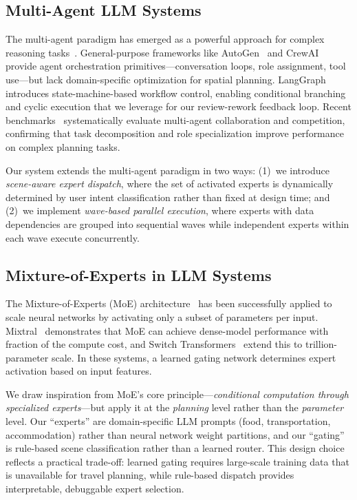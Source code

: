\subsection{Multi-Agent LLM Systems}

The multi-agent paradigm has emerged as a powerful approach for complex reasoning tasks~\cite{tran2025multiagent,xi2023rise}. General-purpose frameworks like AutoGen~\cite{wu2023autogen} and CrewAI~\cite{crewai2024} provide agent orchestration primitives---conversation loops, role assignment, tool use---but lack domain-specific optimization for spatial planning. LangGraph~\cite{langgraph2024} introduces state-machine-based workflow control, enabling conditional branching and cyclic execution that we leverage for our review-rework feedback loop. Recent benchmarks~\cite{multiagentbench2025} systematically evaluate multi-agent collaboration and competition, confirming that task decomposition and role specialization improve performance on complex planning tasks.

Our system extends the multi-agent paradigm in two ways: (1)~we introduce \textit{scene-aware expert dispatch}, where the set of activated experts is dynamically determined by user intent classification rather than fixed at design time; and (2)~we implement \textit{wave-based parallel execution}, where experts with data dependencies are grouped into sequential waves while independent experts within each wave execute concurrently.

\subsection{Mixture-of-Experts in LLM Systems}

The Mixture-of-Experts (MoE) architecture~\cite{shazeer2017outrageously} has been successfully applied to scale neural networks by activating only a subset of parameters per input. Mixtral~\cite{jiang2024mixtral} demonstrates that MoE can achieve dense-model performance with fraction of the compute cost, and Switch Transformers~\cite{fedus2022switch} extend this to trillion-parameter scale. In these systems, a learned gating network determines expert activation based on input features.

We draw inspiration from MoE's core principle---\textit{conditional computation through specialized experts}---but apply it at the \textit{planning} level rather than the \textit{parameter} level. Our ``experts'' are domain-specific LLM prompts (food, transportation, accommodation) rather than neural network weight partitions, and our ``gating'' is rule-based scene classification rather than a learned router. This design choice reflects a practical trade-off: learned gating requires large-scale training data that is unavailable for travel planning, while rule-based dispatch provides interpretable, debuggable expert selection.

